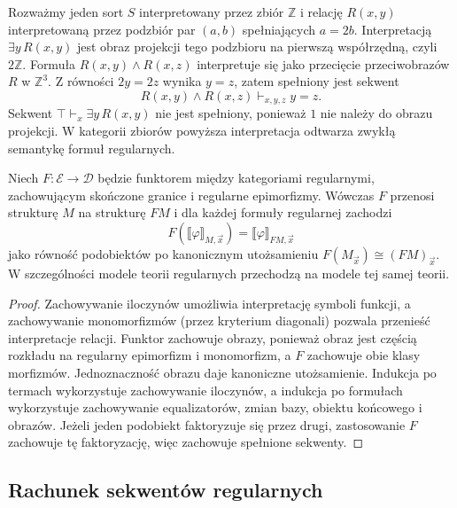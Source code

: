 \begin{przyklad}\label{cat:ex:cl-set-semantics}
Rozważmy jeden sort $S$ interpretowany przez zbiór $\mathbb Z$ i relację $R(x,y)$ interpretowaną przez podzbiór par $(a,b)$ spełniających $a=2b$. Interpretacją $\exists y\,R(x,y)$ jest obraz projekcji tego podzbioru na pierwszą współrzędną, czyli $2\mathbb Z$. Formuła $R(x,y)\wedge R(x,z)$ interpretuje się jako przecięcie przeciwobrazów $R$ w $\mathbb Z^3$. Z równości $2y=2z$ wynika $y=z$, zatem spełniony jest sekwent
\[
 R(x,y)\wedge R(x,z)\vdash_{x,y,z} y=z.
\]
Sekwent $\top\vdash_x\exists y\,R(x,y)$ nie jest spełniony, ponieważ $1$ nie należy do obrazu projekcji. W kategorii zbiorów powyższa interpretacja odtwarza zwykłą semantykę formuł regularnych.
\end{przyklad}

\begin{stwierdzenie}\label{cat:prop:cl-regular-functors}
Niech $F:\mathcal E\to\mathcal D$ będzie funktorem między kategoriami regularnymi, zachowującym skończone granice i regularne epimorfizmy. Wówczas $F$ przenosi strukturę $M$ na strukturę $FM$ i dla każdej formuły regularnej zachodzi
\[
 F(\llbracket\varphi\rrbracket_{M,\vec x})
 =\llbracket\varphi\rrbracket_{FM,\vec x}
\]
jako równość podobiektów po kanonicznym utożsamieniu $F(M_{\vec x})\cong(FM)_{\vec x}$. W szczególności modele teorii regularnych przechodzą na modele tej samej teorii.
\end{stwierdzenie}
\begin{proof}
Zachowywanie iloczynów umożliwia interpretację symboli funkcji, a zachowywanie monomorfizmów (przez kryterium diagonali) pozwala przenieść interpretacje relacji. Funktor zachowuje obrazy, ponieważ obraz jest częścią rozkładu na regularny epimorfizm i monomorfizm, a $F$ zachowuje obie klasy morfizmów. Jednoznaczność obrazu daje kanoniczne utożsamienie. Indukcja po termach wykorzystuje zachowywanie iloczynów, a indukcja po formułach wykorzystuje zachowywanie equalizatorów, zmian bazy, obiektu końcowego i obrazów. Jeżeli jeden podobiekt faktoryzuje się przez drugi, zastosowanie $F$ zachowuje tę faktoryzację, więc zachowuje spełnione sekwenty.
\end{proof}

\subsection{Rachunek sekwentów regularnych}

